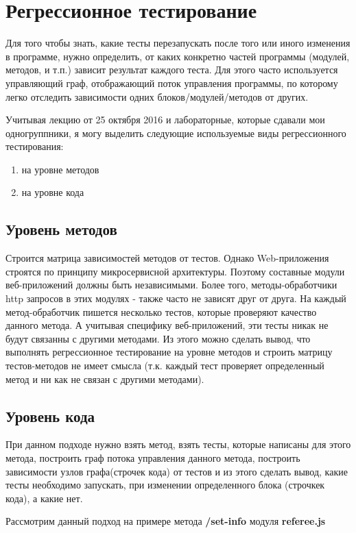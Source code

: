 \section{Регрессионное тестирование}

Для того чтобы знать, какие тесты перезапускать после того или иного изменения в программе, нужно определить, от каких конкретно частей программы (модулей, методов, и т.п.) зависит результат каждого теста. Для этого часто используется ​управляющий граф​, отображающий поток управления программы, по которому легко отследить зависимости одних блоков/модулей/методов от других.

Учитывая лекцию от 25 октября 2016 и лабораторные, которые сдавали мои одногруппники, я могу выделить следующие используемые виды регрессионного тестирования:
\begin{enumerate}
    \item на уровне методов
    \item на уровне кода
\end{enumerate}

\subsection{Уровень методов}
Строится матрица зависимостей методов от тестов. Однако Web-приложения строятся по принципу микросервисной архитектуры. Поэтому составные модули веб-приложений должны быть независимыми. Более того, методы-обработчики http запросов в этих модулях - также часто не зависят друг от друга. На каждый метод-обработчик пишется несколько тестов, которые проверяют качество данного метода. А учитывая специфику веб-приложений, эти тесты никак не будут связанны с другими методами. Из этого можно сделать вывод, что выполнять регрессионное тестирование на уровне методов и строить матрицу тестов-методов не имеет смысла (т.к. каждый тест проверяет определенный метод и ни как не связан с другими методами).

\subsection{Уровень кода}
При данном подходе нужно взять метод, взять тесты, которые написаны для этого метода, построить граф потока управления данного метода, построить зависимости узлов графа(строчек кода) от тестов и из этого сделать вывод, какие тесты необходимо запускать, при изменении определенного блока (строчкек кода), а какие нет.


Рассмотрим данный подход на примере метода \textbf{/set-info} модуля \textbf{referee.js}

